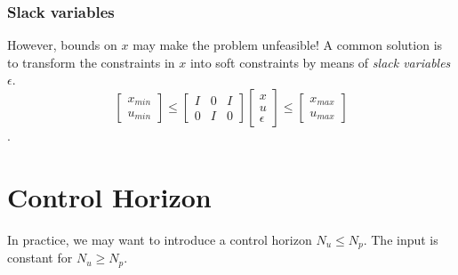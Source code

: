\documentclass[a4paper,12pt,fleqn]{book}
\newcommand{\slack}{\epsilon}
\begin{document}
\subsubsection{Slack variables}
However, bounds on $x$ may make the problem unfeasible! A common solution
is to transform the constraints in $x$ into soft constraints by means of  \emph{slack variables} $\slack$.
\begin{equation}
\begin{bmatrix}
 x_{min}\\u_{min}
\end{bmatrix}
\leq
\begin{bmatrix}
 I &0 &I\\
 0 &I & 0
\end{bmatrix}
\begin{bmatrix}
 x\\
 u\\
 \slack
\end{bmatrix}
\leq
\begin{bmatrix}
 x_{max}\\u_{max}
\end{bmatrix}
\end{equation}.

\section{Control Horizon}
In practice, we may want to introduce a control horizon $N_u \leq N_p$. The input is constant for $N_u \geq N_p$.
\end{document}
